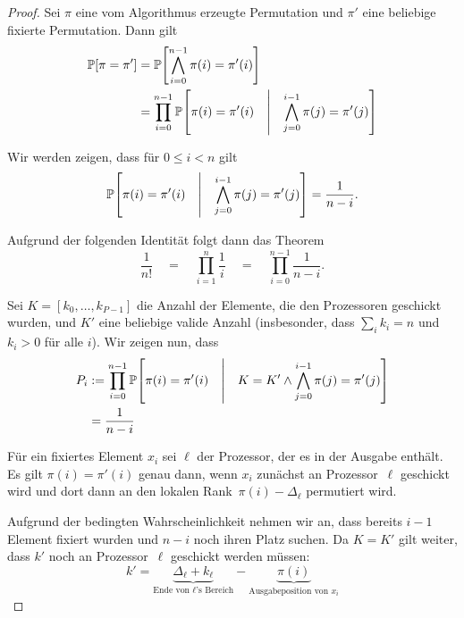 \iffalse
    \begin{proof}
        Sei $\pi$ eine vom Algorithmus erzeugte Permutation und $\pi'$ eine beliebige fixierte Permutation.
        Dann gilt
        \begin{align}
            \mathbb{P}\!\left[\pi = \pi'\right] & = \mathbb{P}\!\left[\bigwedge\limits_{i=0}^{n-1} \pi(i) = \pi'(i)\right]                                                        \\
                              & = \prod_{i=0}^{n-1} \mathbb{P}\!\left[\pi(i) = \pi'(i) \quad\middle|\quad \bigwedge\limits_{j=0}^{i-1} \pi(j) = \pi'(j) \right]
        \end{align}

        \noindent
        Wir werden zeigen, dass für $0 \le i < n$ gilt
        \begin{equation}
            \mathbb{P}\!\left[\pi(i) = \pi'(i) \quad\middle|\quad \bigwedge\limits_{j=0}^{i-1} \pi(j) = \pi'(j) \right] = \frac{1}{n - i}.
        \end{equation}

        \noindent
        Aufgrund der folgenden Identität folgt dann das Theorem
        \begin{equation}
            \frac{1}{n!}
            \quad = \quad \prod_{i=1}^{n} \frac{1}{i}
            \quad = \quad \prod_{i=0}^{n-1}\frac{1}{n-i}.
        \end{equation}

        Sei $K = [k_0, \ldots, k_{P-1}]$ die Anzahl der Elemente, die den Prozessoren geschickt wurden, und $K'$ eine beliebige valide Anzahl (\dh insbesonder, dass $\sum_i k_i = n$ und $k_i > 0$ für alle $i$).
        Wir zeigen nun, dass
        \begin{align}
            P_i & := \prod_{i=0}^{n-1} \mathbb{P}\!\left[\pi(i) = \pi'(i) \quad\middle|\quad K = K' \land \bigwedge\limits_{j=0}^{i-1} \pi(j) = \pi'(j) \right] \\
                & = \frac{1}{n - i}
        \end{align}

        Für ein fixiertes Element $x_i$ sei $\ell$ der Prozessor, der es in der Ausgabe enthält.
        Es gilt $\pi(i) = \pi'(i)$ genau dann, wenn $x_i$ zunächst an Prozessor~$\ell$ geschickt wird und dort dann an den lokalen Rank~$\pi(i) - \Delta_\ell$ permutiert wird.

        Aufgrund der bedingten Wahrscheinlichkeit nehmen wir an, dass bereits $i-1$ Element fixiert wurden und $n-i$ noch ihren Platz suchen.
        Da $K = K'$ gilt weiter, dass $k'$ noch an Prozessor~$\ell$ geschickt werden müssen:
        \begin{equation}
            k' = \underbrace{\Delta_\ell + k_\ell}_\text{Ende von $\ell$'s Bereich} - \underbrace{\pi(i)}_\text{Ausgabeposition von $x_i$}
        \end{equation}


\end{proof}
